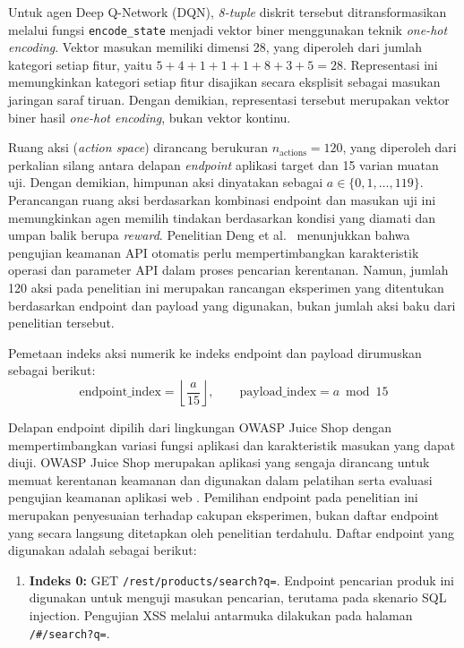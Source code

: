 \begin{enumerate}
Untuk agen Deep Q-Network (DQN), \textit{8-tuple} diskrit tersebut
ditransformasikan melalui fungsi \texttt{encode\_state} menjadi vektor
biner menggunakan teknik \textit{one-hot encoding}. Vektor masukan
memiliki dimensi 28, yang diperoleh dari jumlah kategori setiap fitur,
yaitu $5 + 4 + 1 + 1 + 1 + 8 + 3 + 5 = 28$. Representasi ini
memungkinkan kategori setiap fitur disajikan secara eksplisit sebagai
masukan jaringan saraf tiruan. Dengan demikian, representasi tersebut
merupakan vektor biner hasil \textit{one-hot encoding}, bukan vektor
kontinu.

Ruang aksi (\textit{action space}) dirancang berukuran
$n_{\text{actions}} = 120$, yang diperoleh dari perkalian silang
antara delapan \textit{endpoint} aplikasi target dan 15 varian
muatan uji. Dengan demikian, himpunan aksi dinyatakan sebagai
$a \in \{0,1,\ldots,119\}$. Perancangan ruang aksi berdasarkan
kombinasi endpoint dan masukan uji ini memungkinkan agen memilih
tindakan berdasarkan kondisi yang diamati dan umpan balik berupa
\textit{reward}. Penelitian Deng et al.~\cite{deng2023nautilus}
menunjukkan bahwa pengujian keamanan API otomatis perlu
mempertimbangkan karakteristik operasi dan parameter API dalam
proses pencarian kerentanan. Namun, jumlah 120 aksi pada penelitian
ini merupakan rancangan eksperimen yang ditentukan berdasarkan
endpoint dan payload yang digunakan, bukan jumlah aksi baku dari
penelitian tersebut.

Pemetaan indeks aksi numerik ke indeks endpoint dan payload
dirumuskan sebagai berikut:
\begin{equation}
\text{endpoint\_index} = \left\lfloor \frac{a}{15} \right\rfloor,
\qquad
\text{payload\_index} = a \bmod 15
\label{eq:action_mapping}
\end{equation}

Delapan endpoint dipilih dari lingkungan OWASP Juice Shop dengan
mempertimbangkan variasi fungsi aplikasi dan karakteristik masukan
yang dapat diuji. OWASP Juice Shop merupakan aplikasi yang sengaja
dirancang untuk memuat kerentanan keamanan dan digunakan dalam
pelatihan serta evaluasi pengujian keamanan aplikasi web
\cite{owaspJuiceShop}. Pemilihan endpoint pada penelitian ini
merupakan penyesuaian terhadap cakupan eksperimen, bukan daftar
endpoint yang secara langsung ditetapkan oleh penelitian terdahulu.
Daftar endpoint yang digunakan adalah sebagai berikut:

\begin{enumerate}
    \item \textbf{Indeks 0:} GET
    \texttt{/rest/products/search?q=}. Endpoint pencarian produk
    ini digunakan untuk menguji masukan pencarian, terutama pada
    skenario SQL injection. Pengujian XSS melalui antarmuka
    dilakukan pada halaman \texttt{/\#/search?q=}.


\end{enumerate}
\end{enumerate}
